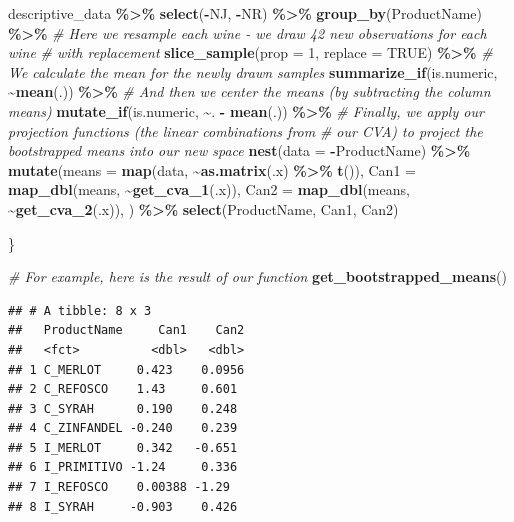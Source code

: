 \documentclass[
]{book}
\newenvironment{Shaded}{\begin{snugshade}}{\end{snugshade}}
\newcommand{\AttributeTok}[1]{\textcolor[rgb]{0.13,0.29,0.53}{#1}}
\newcommand{\CommentTok}[1]{\textcolor[rgb]{0.56,0.35,0.01}{\textit{#1}}}
\newcommand{\ConstantTok}[1]{\textcolor[rgb]{0.56,0.35,0.01}{#1}}
\newcommand{\DecValTok}[1]{\textcolor[rgb]{0.00,0.00,0.81}{#1}}
\newcommand{\FunctionTok}[1]{\textcolor[rgb]{0.13,0.29,0.53}{\textbf{#1}}}
\newcommand{\NormalTok}[1]{#1}
\newcommand{\SpecialCharTok}[1]{\textcolor[rgb]{0.81,0.36,0.00}{\textbf{#1}}}
\begin{document}
\begin{Shaded}
\begin{Highlighting}[]
\NormalTok{  descriptive\_data }\SpecialCharTok{\%\textgreater{}\%}
  \FunctionTok{select}\NormalTok{(}\SpecialCharTok{{-}}\NormalTok{NJ, }\SpecialCharTok{{-}}\NormalTok{NR) }\SpecialCharTok{\%\textgreater{}\%}
  \FunctionTok{group\_by}\NormalTok{(ProductName) }\SpecialCharTok{\%\textgreater{}\%}
    \CommentTok{\# Here we resample each wine {-} we draw 42 new observations for each wine}
    \CommentTok{\# with replacement}
  \FunctionTok{slice\_sample}\NormalTok{(}\AttributeTok{prop =} \DecValTok{1}\NormalTok{, }\AttributeTok{replace =} \ConstantTok{TRUE}\NormalTok{) }\SpecialCharTok{\%\textgreater{}\%}
    \CommentTok{\# We calculate the mean for the newly drawn samples}
  \FunctionTok{summarize\_if}\NormalTok{(is.numeric, }\SpecialCharTok{\textasciitilde{}}\FunctionTok{mean}\NormalTok{(.)) }\SpecialCharTok{\%\textgreater{}\%} 
    \CommentTok{\# And then we center the means (by subtracting the column means)}
  \FunctionTok{mutate\_if}\NormalTok{(is.numeric, }\SpecialCharTok{\textasciitilde{}}\NormalTok{. }\SpecialCharTok{{-}} \FunctionTok{mean}\NormalTok{(.)) }\SpecialCharTok{\%\textgreater{}\%}
    \CommentTok{\# Finally, we apply our projection functions (the linear combinations from}
    \CommentTok{\# our CVA) to project the bootstrapped means into our new space}
  \FunctionTok{nest}\NormalTok{(}\AttributeTok{data =} \SpecialCharTok{{-}}\NormalTok{ProductName) }\SpecialCharTok{\%\textgreater{}\%}
  \FunctionTok{mutate}\NormalTok{(}\AttributeTok{means =} \FunctionTok{map}\NormalTok{(data, }\SpecialCharTok{\textasciitilde{}}\FunctionTok{as.matrix}\NormalTok{(.x) }\SpecialCharTok{\%\textgreater{}\%} \FunctionTok{t}\NormalTok{()),}
         \AttributeTok{Can1 =} \FunctionTok{map\_dbl}\NormalTok{(means, }\SpecialCharTok{\textasciitilde{}}\FunctionTok{get\_cva\_1}\NormalTok{(.x)),}
         \AttributeTok{Can2 =} \FunctionTok{map\_dbl}\NormalTok{(means, }\SpecialCharTok{\textasciitilde{}}\FunctionTok{get\_cva\_2}\NormalTok{(.x)),}
\NormalTok{         ) }\SpecialCharTok{\%\textgreater{}\%}
    \FunctionTok{select}\NormalTok{(ProductName, Can1, Can2)}
  
\NormalTok{\}}

\CommentTok{\# For example, here is the result of our function}
\FunctionTok{get\_bootstrapped\_means}\NormalTok{()}
\end{Highlighting}
\end{Shaded}

\begin{verbatim}
## # A tibble: 8 x 3
##   ProductName     Can1    Can2
##   <fct>          <dbl>   <dbl>
## 1 C_MERLOT     0.423    0.0956
## 2 C_REFOSCO    1.43     0.601 
## 3 C_SYRAH      0.190    0.248 
## 4 C_ZINFANDEL -0.240    0.239 
## 5 I_MERLOT     0.342   -0.651 
## 6 I_PRIMITIVO -1.24     0.336 
## 7 I_REFOSCO    0.00388 -1.29  
## 8 I_SYRAH     -0.903    0.426
\end{verbatim}
\end{document}
